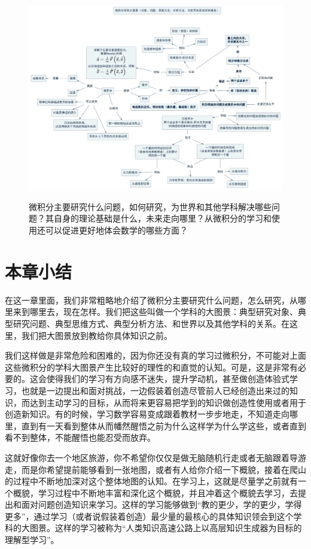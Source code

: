 \documentclass{ctexbook}
\newcommand{\note}[1]{{\color{blue}{#1}}}
\newcommand{\FigLabel}[1]{\label{#1}}
\begin{document}
\begin{figure}
\includegraphics[width=13cm]{figure/CalculusBigPicture}
\caption[微积分学科大图景]{微积分主要研究什么问题，如何研究，为世界和其他学科解决哪些问题？其自身的理论基础是什么，未来走向哪里？从微积分的学习和使用还可以促进更好地体会数学的哪些方面？}\note{可以再调整一下布局，美观一点}
\FigLabel{Fig:CalculusBigPicture}
\end{figure}

\section{本章小结}
在这一章里面，我们非常粗略地介绍了微积分主要研究什么问题，怎么研究，从哪里来到哪里去，现在怎样。我们把这些叫做一个学科的大图景：典型研究对象、典型研究问题、典型思维方式、典型分析方法、和世界以及其他学科的关系。在这里，我们把大图景放到教给你具体知识之前。

我们这样做是非常危险和困难的，因为你还没有真的学习过微积分，不可能对上面这些微积分的学科大图景产生比较好的理性的和直觉的认知。可是，这是非常有必要的。这会使得我们的学习有方向感不迷失，提升学动机，甚至做创造体验式学习，也就是一边提出和面对挑战，一边假装着创造尽管前人已经创造出来过的知识，而达到主动学习的目标，从而将来更容易把学到的知识做创造性使用或者用于创造新知识。有的时候，学习数学容易变成跟着教材一步步地走，不知道走向哪里，直到有一天看到整体从而幡然醒悟之前为什么这样学为什么学这些，或者直到看不到整体，不能醒悟也能忍受而放弃。

这就好像你去一个地区旅游，你不希望你仅仅是做无脑随机行走或者无脑跟着导游走，而是你希望提前能够看到一张地图，或者有人给你介绍一下概貌，接着在爬山的过程中不断地加深对这个整体地图的认知。在学习上，这就是尽量学之前就有一个概貌，学习过程中不断地丰富和深化这个概貌，并且冲着这个概貌去学习，去提出和面对问题创造知识来学习。这样的学习能够做到“教的更少，学的更少，学得更多”，通过学习（或者说假装着创造）最少量的最核心的具体知识领会到这个学科的大图景。这样的学习被称为“人类知识高速公路上以高层知识生成器为目标的理解型学习”\cite{Wu:TLLM}。
\end{document}
